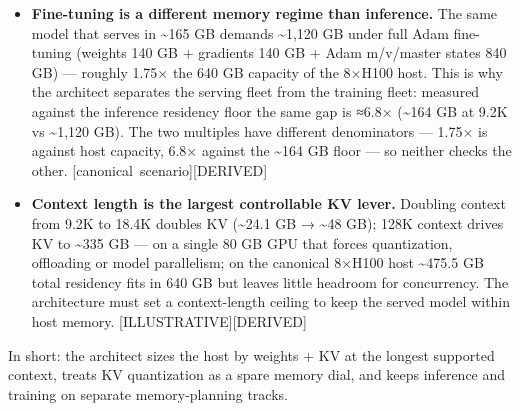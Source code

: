 \begin{itemize}
  it when decode bandwidth may also be limiting.
\item
  \textbf{Fine-tuning is a different memory regime than inference.} The
  same model that serves in \textasciitilde165 GB demands
  \textasciitilde1,120 GB under full Adam fine-tuning (weights 140 GB +
  gradients 140 GB + Adam m/v/master states 840 GB) --- roughly 1.75×
  the 640 GB capacity of the 8×H100 host. This is why the architect
  separates the serving fleet from the training fleet: measured against
  the inference residency floor the same gap is ≈6.8×
  (\textasciitilde164 GB at 9.2K vs \textasciitilde1,120 GB). The two
  multiples have different denominators --- 1.75× is against host
  capacity, 6.8× against the \textasciitilde164 GB floor --- so neither
  checks the other. \mbox{{[}canonical scenario{]}}\hspace{0pt}\mbox{{[}DERIVED{]}}
\item
  \textbf{Context length is the largest controllable KV lever.} Doubling
  context from 9.2K to 18.4K doubles KV (\textasciitilde24.1 GB →
  \textasciitilde48 GB); 128K context drives KV to \textasciitilde335 GB
  --- on a single 80 GB GPU that forces quantization, offloading or
  model parallelism; on the canonical 8×H100 host \textasciitilde475.5
  GB total residency fits in 640 GB but leaves little headroom for
  concurrency. The architecture must set a context-length ceiling to
  keep the served model within host memory.
  \mbox{{[}ILLUSTRATIVE{]}}\hspace{0pt}\mbox{{[}DERIVED{]}}
\end{itemize}

In short: the architect sizes the host by weights + KV at the longest
supported context, treats KV quantization as a spare memory dial, and
keeps inference and training on separate memory-planning tracks.

\label{what-we-still-dont-know}


